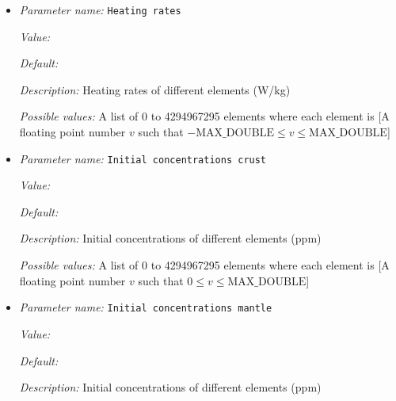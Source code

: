 \begin{itemize}
{\it Default:} 


{\it Description:} Half decay times. Units: (Seconds), or (Years) if set `use years instead of seconds'.


{\it Possible values:} A list of 0 to 4294967295 elements where each element is [A floating point number $v$ such that $0 \leq v \leq \text{MAX\_DOUBLE}$]
\item {\it Parameter name:} {\tt Heating rates}
\label{parameters:Heating model/Radioactive decay/Heating rates}
\label{parameters:Heating_20model/Radioactive_20decay/Heating_20rates}


{\it Value:} 


{\it Default:} 


{\it Description:} Heating rates of different elements (W/kg)


{\it Possible values:} A list of 0 to 4294967295 elements where each element is [A floating point number $v$ such that $-\text{MAX\_DOUBLE} \leq v \leq \text{MAX\_DOUBLE}$]
\item {\it Parameter name:} {\tt Initial concentrations crust}
\label{parameters:Heating model/Radioactive decay/Initial concentrations crust}
\label{parameters:Heating_20model/Radioactive_20decay/Initial_20concentrations_20crust}


{\it Value:} 


{\it Default:} 


{\it Description:} Initial concentrations of different elements (ppm)


{\it Possible values:} A list of 0 to 4294967295 elements where each element is [A floating point number $v$ such that $0 \leq v \leq \text{MAX\_DOUBLE}$]
\item {\it Parameter name:} {\tt Initial concentrations mantle}
\label{parameters:Heating model/Radioactive decay/Initial concentrations mantle}
\label{parameters:Heating_20model/Radioactive_20decay/Initial_20concentrations_20mantle}


{\it Value:} 


{\it Default:} 


{\it Description:} Initial concentrations of different elements (ppm)



\end{itemize}
